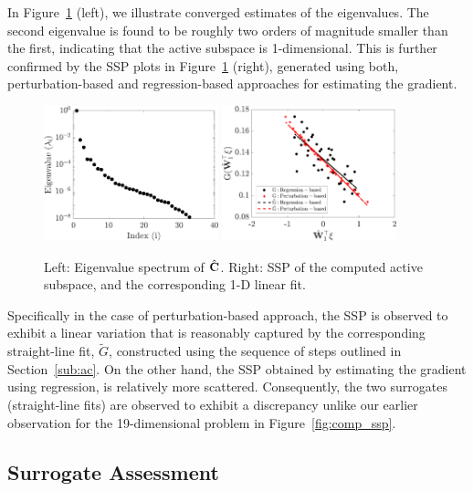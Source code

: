 In Figure~\ref{fig:hd} (left), we illustrate converged estimates of the eigenvalues.
 The second eigenvalue is
found to be roughly two orders of magnitude smaller than the first, indicating that the active subspace
is 1-dimensional. This is further confirmed by the SSP plots in Figure~\ref{fig:hd} (right), generated
using both, perturbation-based and regression-based approaches for estimating
the gradient. 
%
\begin{figure}[htbp]
 \begin{center}
   \includegraphics[width=0.45\textwidth]{./Figures/eig_33D}
   \includegraphics[width=0.45\textwidth]{./Figures/ssp_33D}
\caption{Left: Eigenvalue spectrum of $\hat{\mathbf{{C}}}$. Right: SSP of the computed active subspace, and the
corresponding 1-D linear fit.} 
\label{fig:hd}
\end{center}
\end{figure}
%
Specifically
in the case of perturbation-based approach, the SSP is observed to exhibit a linear variation that
is reasonably
captured by the corresponding straight-line fit, $\tilde{G}$, constructed using the sequence of steps
outlined in Section~\ref{sub:ac}.
On the other hand, the SSP obtained by estimating the gradient using regression,
is relatively more scattered. Consequently, the two surrogates (straight-line fits) are observed to exhibit a
discrepancy unlike our earlier observation for the 19-dimensional problem in Figure~\ref{fig:comp_ssp}. 

\subsection{Surrogate Assessment}
\label{sub:verify}

